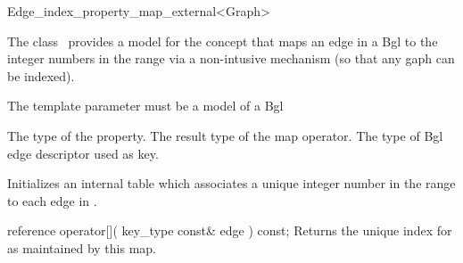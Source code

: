 

\begin{ccRefClass}{Edge_index_property_map_external<Graph>}


\ccDefinition

The class \ccRefName\ provides a model for the concept 
that maps an edge in a {\sc Bgl}
to the integer numbers in the range 
via a non-intusive mechanism (so that any gaph can be indexed).

The template parameter  must be a model of a {\sc Bgl}


\ccTypes
    {The type of the property.}
\ccGlue
    {The result type of the map operator.}
\ccGlue
\ccGlue
  {The type of {\sc Bgl} edge descriptor used as key.}

\ccCreation
{}  %

{Initializes an internal table which associates a unique integer
number in the range  to each edge in .}

\ccOperations

\ccMethod
  {reference operator[]( key_type const& edge ) const;}
  {Returns the unique index for  as maintained by this map.}
    
\ccIsModel
{} 


\end{ccRefClass}


